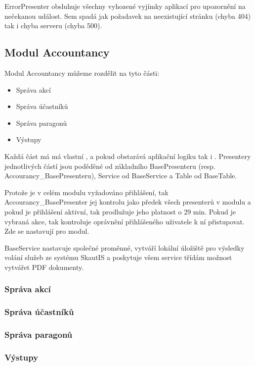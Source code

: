 \documentclass[thesis=B,czech]{FITthesis}[2011/06/14]
\begin{document}
ErrorPresenter obsluhuje všechny vyhozené vyjímky aplikací pro upozornění na nečekanou událost. Sem spadá jak požadavek na neexistující stránku (chyba 404) tak i chyba serveru (chyba 500).

\subsection{Modul Accountancy}

Modul Accountancy můžeme rozdělit na tyto části:
\begin{itemize}
	\item Správa akcí
	\item Správa účastníků
	\item Správa paragonů
	\item Výstupy
\end{itemize}

Každá část má má vlastní ,  a pokud obstarává aplikační logiku tak i . Presentery jednotlivých částí jsou poděděné od základního BasePresenteru (resp. Accourancy\_BasePresenteru), Service od BaseService a Table od BaseTable.

Protože je v celém modulu vyžadováno přihlášení, tak Accourancy\_BasePresenter jej kontrolu jako předek všech presenterů v modulu a pokud je přihlášení aktivní, tak prodlužuje jeho platnost o 29 min. Pokud je vybraná akce, tak kontroluje oprávnění přihlášeného uživatele k ní přistupovat. Zde se nastavují  pro modul.

BaseService nastavuje společné proměnné, vytváří lokální úložiště pro výsledky volání služeb ze systému SkautIS a poskytuje všem service třídám možnost vytvářet PDF dokumenty.

\subsubsection{Správa akcí}

\subsubsection{Správa účastníků}

\subsubsection{Správa paragonů}

\subsubsection{Výstupy}
\end{document}
